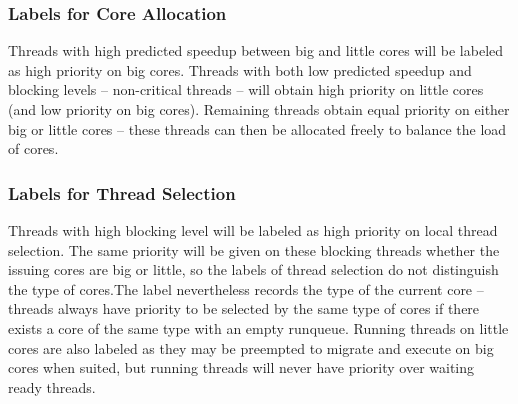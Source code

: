 \documentclass[10pt,conference]{IEEEtran}
\begin{document}
\subsubsection{Labels for Core Allocation}
Threads with high predicted speedup between big and little cores will be labeled as high priority on big cores. Threads with both low predicted speedup and blocking levels -- non-critical threads -- will obtain high priority on little cores (and low priority on big cores). Remaining threads obtain equal priority on either big or little cores -- these threads can then be allocated freely to balance the load of cores.
\subsubsection{Labels for Thread Selection}
Threads with high blocking level will be labeled as high priority on local thread selection. The same priority will be given on these blocking threads whether the issuing cores are big or little, so the labels of thread selection do not distinguish the type of cores.The label nevertheless records the type of the current core -- threads always have priority to be selected by the same type of cores if there exists a core of the same type with an empty runqueue. Running threads on little cores are also labeled as they may be preempted to migrate and execute on big cores when suited, but running threads will never have priority over waiting ready threads. 



\end{document}
